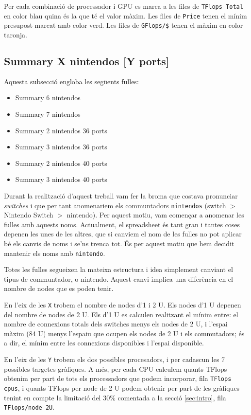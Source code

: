 Per cada combinació de processador i GPU es marca a les files de \texttt{TFlops Total} en color blau quina és la que té el valor màxim. Les files de \texttt{Price} tenen el mínim presupost marcat amb color verd. Les files de \texttt{GFlops/\$} tenen el màxim en color taronja.

\subsection{Summary X nintendos [Y ports]} \label{sec:annex_summary}
Aquesta subsecció engloba les següents fulles:
\begin{itemize}
    \item Summary 6 nintendos
    \item Summary 7 nintendos
    \item Summary 2 nintendos 36 ports
    \item Summary 3 nintendos 36 ports
    \item Summary 2 nintendos 40 ports
    \item Summary 3 nintendos 40 ports
\end{itemize}

Durant la realització d'aquest treball vam fer la broma que costava pronunciar \textit{switches} i que per tant anomenariem els communtadors \texttt{nintendos} (switch $>$ Nintendo Switch $>$ nintendo). Per aquest motiu, vam començar a anomenar les fulles amb aquests noms.
Actualment, el spreadsheet és tant gran i tantes coses depenen les unes de les altres, que si canviem el nom de les fulles no pot aplicar bé els canvis de noms i se'ns trenca tot. És per aquest motiu que hem decidit mantenir els noms amb \texttt{nintendo}.

Totes les fulles segueixen la mateixa estructura i idea simplement canviant el tipus de communtador, o nintendo. Aquest canvi implica una diferència en el nombre de nodes que es poden tenir.

En l'eix de les \texttt{X} trobem el nombre de nodes d'1 i 2 U. Els nodes d'1 U depenen del nombre de nodes de 2 U. Els d'1 U es calculen realitzant el mínim entre: el nombre de connexions totals dels switches menys els nodes de 2 U, i l'espai màxim (84 U) menys l'espaiu que ocupen els nodes de 2 U i els commutadors; és a dir, el mínim entre les connexions disponibles i l'espai disponible. 

En l'eix de les \texttt{Y} trobem els dos possibles procesadors, i per cadascun les 7 possibles targetes gràfiques. A més, per cada CPU calculem quants TFlops obtenim per part de tots els processadors que podem incorporar, fila \texttt{TFlops cpus}, i quants TFlops per node de 2 U podem obtenir per part de les gràfiques tenint en compte la limitació del 30\% comentada a la secció \ref{sec:intro}, fila \texttt{TFlops/node 2U}.

